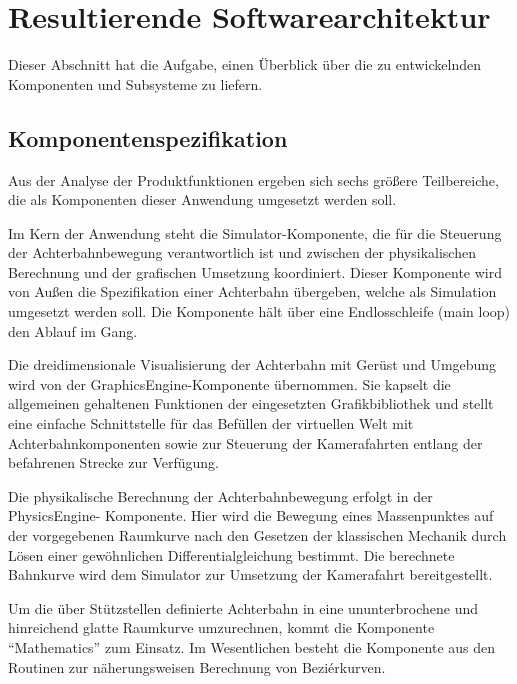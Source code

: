 \chapter{Resultierende Softwarearchitektur}

Dieser Abschnitt hat die Aufgabe, einen Überblick über die zu entwickelnden
Komponenten und Subsysteme zu liefern.
\section{Komponentenspezifikation}

Aus der Analyse der Produktfunktionen ergeben sich sechs größere Teilbereiche,
die als Komponenten dieser Anwendung umgesetzt werden soll.

Im Kern der Anwendung steht die Simulator-Komponente, die für die Steuerung der
Achterbahnbewegung verantwortlich ist und zwischen der physikalischen Berechnung
und der grafischen Umsetzung koordiniert. Dieser Komponente wird von Außen die
Spezifikation einer Achterbahn übergeben, welche als Simulation umgesetzt werden
soll. Die Komponente hält über eine Endlosschleife (main loop) den Ablauf im Gang.

Die dreidimensionale Visualisierung der Achterbahn mit Gerüst und Umgebung wird
von der GraphicsEngine-Komponente übernommen. Sie kapselt die allgemeinen gehaltenen
Funktionen der eingesetzten Grafikbibliothek und stellt eine einfache Schnittstelle
für das Befüllen der virtuellen Welt mit Achterbahnkomponenten sowie zur Steuerung
der Kamerafahrten entlang der befahrenen Strecke zur Verfügung.

Die physikalische Berechnung der Achterbahnbewegung erfolgt in der PhysicsEngine-
Komponente. Hier wird die Bewegung eines Massenpunktes auf der vorgegebenen Raumkurve
nach den Gesetzen der klassischen Mechanik durch Lösen einer gewöhnlichen 
Differentialgleichung bestimmt. Die berechnete Bahnkurve wird dem Simulator zur
Umsetzung der Kamerafahrt bereitgestellt.

Um die über Stützstellen definierte Achterbahn in eine ununterbrochene und hinreichend
glatte Raumkurve umzurechnen, kommt die Komponente ``Mathematics'' zum Einsatz. Im
Wesentlichen besteht die Komponente aus den Routinen zur näherungsweisen Berechnung
von Beziérkurven.    

